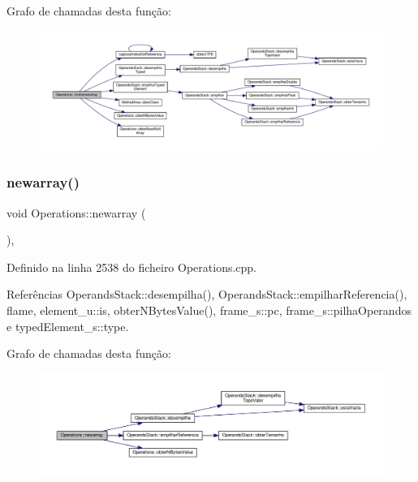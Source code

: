 Grafo de chamadas desta função\+:
\nopagebreak
\begin{figure}[H]
\begin{center}
\leavevmode
\includegraphics[width=350pt]{classOperations_a78c45edfcdf63668974ffc3b2d84a309_cgraph}
\end{center}
\end{figure}
\mbox{\label{classOperations_a3537f097b63240202ac0c9249dda33a9}} 
\subsubsection{\texorpdfstring{newarray()}{newarray()}}
{\footnotesize\ttfamily void Operations\+::newarray (\begin{DoxyParamCaption}{ }\end{DoxyParamCaption})\hspace{0.3cm}{\ttfamily [static]}, {\ttfamily [private]}}



Definido na linha 2538 do ficheiro Operations.\+cpp.



Referências Operands\+Stack\+::desempilha(), Operands\+Stack\+::empilhar\+Referencia(), flame, element\+\_\+u\+::is, obter\+N\+Bytes\+Value(), frame\+\_\+s\+::pc, frame\+\_\+s\+::pilha\+Operandos e typed\+Element\+\_\+s\+::type.

Grafo de chamadas desta função\+:
\nopagebreak
\begin{figure}[H]
\begin{center}
\leavevmode
\includegraphics[width=350pt]{classOperations_a3537f097b63240202ac0c9249dda33a9_cgraph}
\end{center}
\end{figure}
\mbox{\label{classOperations_a3426eecc1b88f11cc8317f99d430a201}} 
